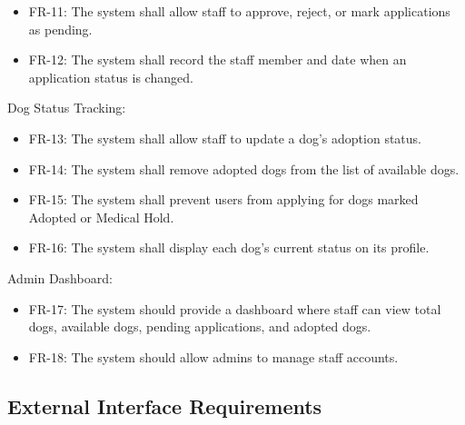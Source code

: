 \documentclass[12pt]{article}
\begin{document}
\begin{itemize}\item FR-11: The system shall allow staff to approve, reject, or mark applications as pending.\end{itemize}
\begin{itemize}\item FR-12: The system shall record the staff member and date when an application status is changed.\end{itemize}
Dog Status Tracking:
\begin{itemize}\item FR-13: The system shall allow staff to update a dog’s adoption status.\end{itemize}
\begin{itemize}\item FR-14: The system shall remove adopted dogs from the list of available dogs.\end{itemize}
\begin{itemize}\item FR-15: The system shall prevent users from applying for dogs marked Adopted or Medical Hold.\end{itemize}
\begin{itemize}\item FR-16: The system shall display each dog’s current status on its profile.\end{itemize}
Admin Dashboard:
\begin{itemize}\item FR-17: The system should provide a dashboard where staff can view total dogs, available dogs, pending applications, and adopted dogs.\end{itemize}
\begin{itemize}\item FR-18: The system should allow admins to manage staff accounts.\end{itemize}
\subsection{External Interface Requirements}
\end{document}

